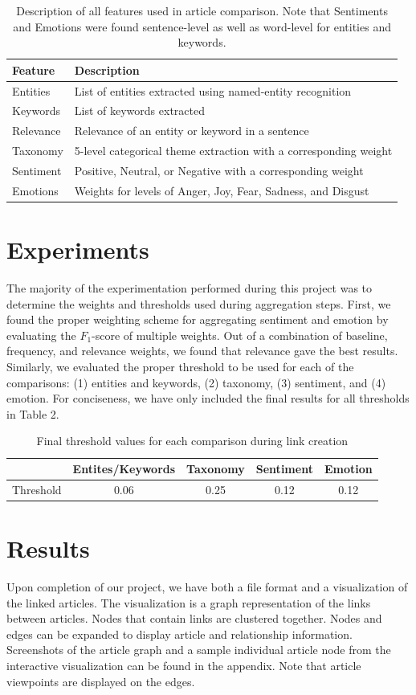 \documentclass[12pt]{article}
\begin{document}
\begin{table}
	\begin{tabular}{|l|l|}\hline
		Feature & Description\\\hline
		Entities & List of entities extracted using named-entity recognition\\
		Keywords & List of keywords extracted\\
		Relevance & Relevance of an entity or keyword in a sentence\\
		Taxonomy & 5-level categorical theme extraction with a corresponding weight\\
		Sentiment & Positive, Neutral, or Negative with a corresponding weight\\
		Emotions & Weights for levels of Anger, Joy, Fear, Sadness, and Disgust\\\hline
	\end{tabular}
	\caption{Description of all features used in article comparison. Note that Sentiments and Emotions were found sentence-level as well as word-level for entities and keywords.}
\end{table}

\section{Experiments}
The majority of the experimentation performed during this project was to determine the weights and thresholds used during aggregation steps. First, we found the proper weighting scheme for aggregating sentiment and emotion by evaluating the $F_1$-score of multiple weights. Out of a combination of baseline, frequency, and relevance weights, we found that relevance gave the best results. Similarly, we evaluated the proper threshold to be used for each of the comparisons: (1) entities and keywords, (2) taxonomy, (3) sentiment, and (4) emotion. For conciseness, we have only included the final results for all thresholds in Table 2.

\begin{table}
	\begin{tabular}{|c|c|c|c|c|}\hline
		 & Entites/Keywords & Taxonomy & Sentiment & Emotion\\\hline
		Threshold & 0.06 & 0.25 & 0.12 & 0.12\\\hline
	\end{tabular}
	\caption{Final threshold values for each comparison during link creation}
\end{table}

\section{Results}
Upon completion of our project, we have both a file format and a visualization of the linked articles. The visualization is a graph representation of the links between articles. Nodes that contain links are clustered together. Nodes and edges can be expanded to display article and relationship information. Screenshots of the article graph and a sample individual article node from the interactive visualization can be found in the appendix. Note that article viewpoints are displayed on the edges.
\end{document}
